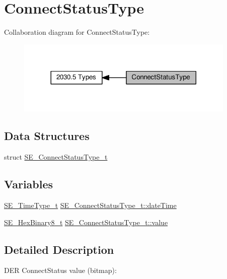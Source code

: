 \hypertarget{group__ConnectStatusType}{}\section{Connect\+Status\+Type}
\label{group__ConnectStatusType}
Collaboration diagram for Connect\+Status\+Type\+:\nopagebreak
\begin{figure}[H]
\begin{center}
\leavevmode
\includegraphics[width=296pt]{group__ConnectStatusType}
\end{center}
\end{figure}
\subsection*{Data Structures}
\begin{DoxyCompactItemize}
\item 
struct \hyperlink{structSE__ConnectStatusType__t}{S\+E\+\_\+\+Connect\+Status\+Type\+\_\+t}
\end{DoxyCompactItemize}
\subsection*{Variables}
\begin{DoxyCompactItemize}
\item 
\hyperlink{group__TimeType_ga6fba87a5b57829b4ff3f0e7638156682}{S\+E\+\_\+\+Time\+Type\+\_\+t} \hyperlink{group__ConnectStatusType_ga5372706a2bc34efc05ea352a246caf99}{S\+E\+\_\+\+Connect\+Status\+Type\+\_\+t\+::date\+Time}
\item 
\hyperlink{group__HexBinary8_gaecf2dab3615fb954a693c017a61f77d6}{S\+E\+\_\+\+Hex\+Binary8\+\_\+t} \hyperlink{group__ConnectStatusType_ga6515f58537159856cbfd403b4bb2919e}{S\+E\+\_\+\+Connect\+Status\+Type\+\_\+t\+::value}
\end{DoxyCompactItemize}


\subsection{Detailed Description}
D\+ER Connect\+Status value (bitmap)\+:

